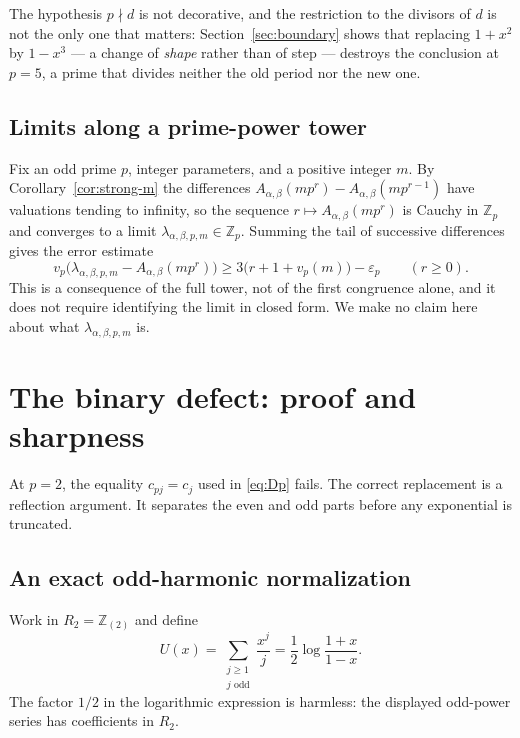 \documentclass[11pt,a4paper]{article}
\numberwithin{equation}{section}
\theoremstyle{definition}
\theoremstyle{remark}
\newcommand{\Z}{\mathbb Z}
\newcommand{\eps}{\varepsilon}
\newcommand{\A}{A_{\alpha,\beta}}
\begin{document}
The hypothesis $p\nmid d$ is not decorative, and the restriction to the
divisors of $d$ is not the only one that matters: Section~\ref{sec:boundary}
shows that replacing $1+x^2$ by $1-x^3$ --- a change of \emph{shape} rather
than of step --- destroys the conclusion at $p=5$, a prime that divides
neither the old period nor the new one.

\subsection{Limits along a prime-power tower}
\label{sec:padic-limit}
Fix an odd prime $p$, integer parameters, and a positive integer $m$. By
Corollary~\ref{cor:strong-m} the differences
$\A(mp^{r})-\A(mp^{r-1})$ have valuations tending to infinity, so the
sequence $r\mapsto\A(mp^r)$ is Cauchy in $\Z_p$ and converges to a limit
$\lambda_{\alpha,\beta,p,m}\in\Z_p$. Summing the tail of successive
differences gives the error estimate
\begin{equation}\label{eq:padic-limit}
 v_p\bigl(\lambda_{\alpha,\beta,p,m}-\A(mp^r)\bigr)
 \ge3\bigl(r+1+v_p(m)\bigr)-\eps_p\qquad(r\ge0).
\end{equation}
This is a consequence of the full tower, not of the first congruence alone,
and it does not require identifying the limit in closed form. We make no
claim here about what $\lambda_{\alpha,\beta,p,m}$ is.

\section{The binary defect: proof and sharpness}
\label{sec:binary}

At $p=2$, the equality $c_{pj}=c_j$ used in \eqref{eq:Dp} fails. The correct
replacement is a reflection argument. It separates the even and odd parts
before any exponential is truncated.

\subsection{An exact odd-harmonic normalization}
Work in $R_2=\Z_{(2)}$ and define
\begin{equation}\label{eq:U}
 U(x)=\sum_{\substack{j\ge1\\j\text{ odd}}}\frac{x^j}{j}
     =\frac12\log\frac{1+x}{1-x}.
\end{equation}
The factor $1/2$ in the logarithmic expression is harmless: the displayed
odd-power series has coefficients in $R_2$.
\end{document}
